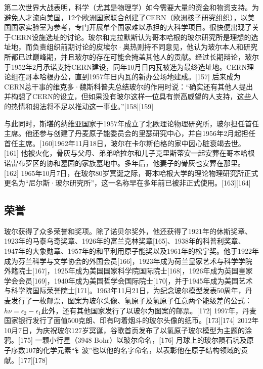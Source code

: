 第二次世界大战表明，科学（尤其是物理学）如今需要大量的资金和物资支持。为避免人才流向美国，12个欧洲国家联合创建了CERN（欧洲核子研究组织），以美国国家实验室为参考，专门开展单个国家难以承担的大科学项目。很快便出现了关于CERN设施选址的讨论。玻尔和克拉默斯认为哥本哈根的玻尔研究所是理想的选址地，而负责组织前期讨论的皮埃尔·奥热则持不同意见，他认为玻尔本人和研究所都已过巅峰期，并且玻尔的存在可能会掩盖其他人的贡献。经过长期辩论，玻尔于1952年2月承诺支持CERN建设，同年10月日内瓦被选为最终选址地。CERN理论组在哥本哈根办公，直到1957年日内瓦的新办公场地建成。[157] 后来成为CERN总干事的维克多·魏斯科普夫总结玻尔的作用时说：“确实还有其他人提出并构想了CERN的设立，但如果没有玻尔这样一位具有崇高威望的人支持，这些人的热情和想法将不足以推动这一事业。”[158][159]

与此同时，斯堪的纳维亚国家于1957年成立了北欧理论物理研究所，玻尔担任首任主席。他还参与创建了丹麦原子能委员会的里瑟研究中心，并自1956年2月起担任首任主席。[160]1962年11月18日，玻尔在卡尔斯伯格的家中因心脏衰竭去世。[161] 他被火化，骨灰与父母、弟弟哈拉尔和儿子克里斯蒂安一起安葬在哥本哈根诺雷布罗区的协和墓园的家族墓地中。多年后，他妻子的骨灰也安葬在那里。[162] 1965年10月7日，在玻尔80岁冥诞之际，哥本哈根大学的理论物理研究所正式更名为“尼尔斯·玻尔研究所”，这一名称早在多年前已被非正式使用。[163][164]
\subsection{荣誉}
玻尔获得了众多荣誉和奖项。除了诺贝尔奖外，他还获得了1921年的休斯奖章、1923年的马泰乌奇奖章、1926年的富兰克林奖章[165]、1938年的科普利奖章、1947年的大象勋章、1957年的和平利用原子能奖以及1961年的松宁奖。他于1922年成为芬兰科学与文学协会的外国会员[166]，1923年成为荷兰皇家艺术与科学学院外籍院士[167]，1925年成为美国国家科学院国际院士[168]，1926年成为英国皇家学会会员[169]，1940年成为美国哲学会国际院士[170]，并于1945年成为美国艺术与科学院国际荣誉院士[171]。1963年11月21日，为纪念玻尔模型发表50周年，丹麦发行了一枚邮票，图案为玻尔头像、氢原子及氢原子任意两个能级差的公式：$h\nu = \epsilon_2 - \epsilon_1$此外，还有其他国家发行了以玻尔为图案的邮票。[172] 1997年，丹麦国家银行发行了面值500克朗、印有叼着烟斗的玻尔头像的纸币。[173][174] 2012年10月7日，为庆祝玻尔127岁冥诞，谷歌首页发布了以氢原子玻尔模型为主题的涂鸦。[175] 一颗小行星（3948 Bohr）以玻尔命名，[176] 月球上的玻尔陨石坑及原子序数107的化学元素“钅波”也以他的名字命名，以表彰他在原子结构领域的贡献。[177][178]
